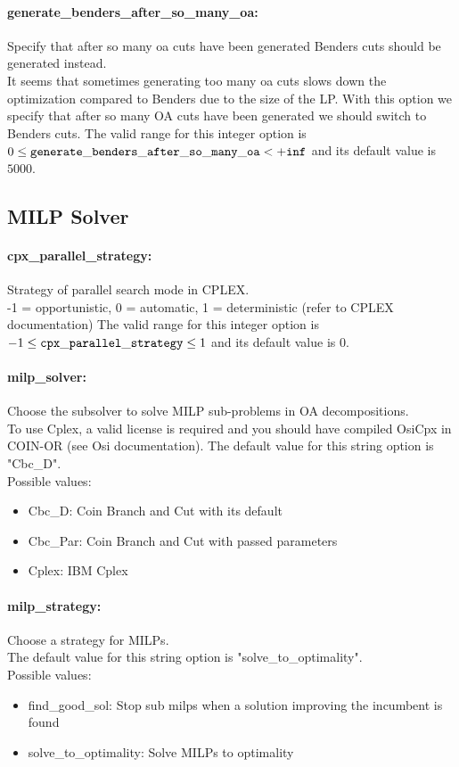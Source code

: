 \paragraph{generate\_benders\_after\_so\_many\_oa:}\label{opt:generate_benders_after_so_many_oa} Specify that after so many oa cuts have been generated Benders cuts should be generated instead. \\
 It seems that sometimes generating too many oa cuts slows down the optimization compared to Benders due to the size of the LP. With this option we specify that after so many OA cuts have been generated we should switch to Benders cuts. The valid range for this integer option is
$0 \le {\tt generate\_benders\_after\_so\_many\_oa } <  {\tt +inf}$
and its default value is $5000$.


\subsection{MILP Solver}
\label{sec:MILPSolver}
\paragraph{cpx\_parallel\_strategy:}\label{opt:cpx_parallel_strategy} Strategy of parallel search mode in CPLEX. \\
 -1 = opportunistic, 0 = automatic, 1 = deterministic (refer to CPLEX documentation) The valid range for this integer option is
$-1 \le {\tt cpx\_parallel\_strategy } \le 1$
and its default value is $0$.


\paragraph{milp\_solver:}\label{opt:milp_solver} Choose the subsolver to solve MILP sub-problems in OA decompositions. \\
  To use Cplex, a valid license is required and you should have compiled OsiCpx in COIN-OR  (see Osi documentation). The default value for this string option is "Cbc\_D".
\\ 
Possible values:
\begin{itemize}
   \item Cbc\_D: Coin Branch and Cut with its default
   \item Cbc\_Par: Coin Branch and Cut with passed parameters
   \item Cplex: IBM Cplex
\end{itemize}

\paragraph{milp\_strategy:}\label{opt:milp_strategy} Choose a strategy for MILPs. \\
 The default value for this string option is "solve\_to\_optimality".
\\ 
Possible values:
\begin{itemize}
   \item find\_good\_sol: Stop sub milps when a solution improving the incumbent is found
   \item solve\_to\_optimality: Solve MILPs to optimality
\end{itemize}


